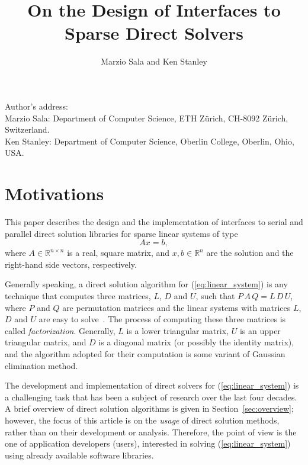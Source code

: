 \documentclass[acmtocl]{acmtrans2m}
\title{On the Design of Interfaces to Sparse Direct Solvers}
\author{Marzio Sala and Ken Stanley}
\begin{document}
\setcounter{page}{1}

\begin{bottomstuff}
Author's address:   \\
Marzio Sala: Department of Computer Science, ETH Z\"urich, CH-8092 Z\"urich,
  Switzerland. \\
Ken Stanley: Department of Computer Science, Oberlin College, Oberlin, Ohio, USA.
\end{bottomstuff}

\maketitle

\section{Motivations}
\label{sec:introduction}

This paper describes the design and the implementation of 
interfaces to serial and parallel direct solution libraries for
sparse linear systems of type
\begin{equation}
  \label{eq:linear_system}
  A x = b,
\end{equation}
where $A \in \mathbb{R}^{n \times n}$ is a real, square matrix, 
  and $x, b \in \mathbb{R}^{n}$ are the solution and
the right-hand side vectors, respectively. 

Generally speaking,
a direct solution algorithm for (\ref{eq:linear_system}) is any 
technique that computes three matrices, $L$, $D$ and $U$, such that
$P\, A\, Q = L \, D \, U$, where $P$ and $Q$ are permutation matrices
and the linear systems with matrices $L$, $D$ and $U$ are
easy to solve~\cite{golub96matrix}. 
The process of computing these three matrices is called {\sl
  factorization}. Generally, $L$ is a lower triangular matrix, $U$ is an
upper triangular matrix, and $D$ is a diagonal matrix 
(or possibly the identity matrix), and the algorithm adopted for their
computation is some variant of Gaussian elimination method.

The development and implementation of
direct solvers for (\ref{eq:linear_system}) is a
challenging task that has been a subject of research over the
last four decades. 
A brief overview of direct solution algorithms  is given in 
Section~\ref{sec:overview}; however,
the focus of this article is on the {\sl usage} of direct solution methods,
    rather than on their development or analysis.
Therefore, the point of view is the one
of application developers (users), interested in solving
(\ref{eq:linear_system}) using already available software libraries.  
\end{document}
